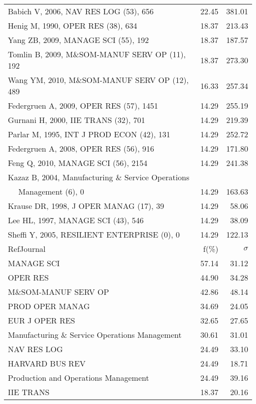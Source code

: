 \documentclass[a4paper,11pt]{report}
\begin{document}
\begin{landscape}
\begin{table}[!ht]
{\begin{tabular}{|l r r|}
Babich V, 2006, NAV RES LOG (53), 656 & 22.45 & 381.01\\
Henig M, 1990, OPER RES (38), 634 & 18.37 & 213.43\\
Yang ZB, 2009, MANAGE SCI (55), 192 & 18.37 & 187.57\\
Tomlin B, 2009, M\&SOM-MANUF SERV OP (11), 192 & 18.37 & 273.30\\
Wang YM, 2010, M\&SOM-MANUF SERV OP (12), 489 & 16.33 & 257.34\\
Federgruen A, 2009, OPER RES (57), 1451 & 14.29 & 255.19\\
Gurnani H, 2000, IIE TRANS (32), 701 & 14.29 & 219.39\\
Parlar M, 1995, INT J PROD ECON (42), 131 & 14.29 & 252.72\\
Federgruen A, 2008, OPER RES (56), 916 & 14.29 & 171.80\\
Feng Q, 2010, MANAGE SCI (56), 2154 & 14.29 & 241.38\\
Kazaz B, 2004, Manufacturing \& Service Operations &  & \\
$\quad$ Management (6), 0 & 14.29 & 163.63\\
Krause DR, 1998, J OPER MANAG (17), 39 & 14.29 & 58.06\\
Lee HL, 1997, MANAGE SCI (43), 546 & 14.29 & 38.09\\
Sheffi Y, 2005, RESILIENT ENTERPRISE (0), 0 & 14.29 & 122.13\\
\hline
\hline
RefJournal & f(\%) & $\sigma$\\
\hline
MANAGE SCI & 57.14 & 31.12\\
OPER RES & 44.90 & 34.28\\
M\&SOM-MANUF SERV OP & 42.86 & 48.14\\
PROD OPER MANAG & 34.69 & 24.05\\
EUR J OPER RES & 32.65 & 27.65\\
Manufacturing \& Service Operations Management & 30.61 & 31.01\\
NAV RES LOG & 24.49 & 33.10\\
HARVARD BUS REV & 24.49 & 18.71\\
Production and Operations Management & 24.49 & 39.16\\
IIE TRANS & 18.37 & 20.16\\
\hline
\end{tabular}
}
\end{table}

\clearpage


\end{landscape}
\end{document}
